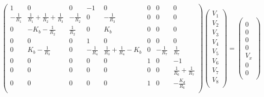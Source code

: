 \begin{equation}
  \begin{pmatrix}
    1 & 0 & 0 & -1 & 0 & 0 & 0 & 0 \\
    -\frac{1}{R_1} & \frac{1}{R_1}+\frac{1}{R_2}+\frac{1}{R_3} & -\frac{1}{R_2} & 0 & -\frac{1}{R_3} & 0 & 0 & 0 \\
    0 & -K_b-\frac{1}{R_2} & \frac{1}{R_2} & 0 & K_b & 0 & 0 & 0 \\
    0 & 0 & 0 & 1 & 0 & 0 & 0 & 0 \\
    0 & K_b-\frac{1}{R_3} & 0 & -\frac{1}{R_4} & \frac{1}{R_3}+\frac{1}{R_4}-K_b & 0 & -\frac{1}{R_7} & \frac{1}{R_7} \\
    0 & 0 & 0 & 0 & 0 & 1 & 0 & -1 \\
    0 & 0 & 0 & 0 & 0 & 0 & 0 & \frac{1}{R_6}+\frac{1}{R_7} \\
    0 & 0 & 0 & 0 & 0 & 1 & 0 & -\frac{K_d}{R_6} \\
  \end{pmatrix}
  \begin{pmatrix}
    V_1  \\
    V_2  \\
    V_3  \\
    V_4  \\
    V_5  \\
    V_6  \\
    V_7  \\
    V_8  \\
  \end{pmatrix}
  =
  \begin{pmatrix}
     \\
    0   \\
    0   \\
    0   \\
    0   \\
    V_x  \\
    0   \\
    0   \\
  \end{pmatrix}
  \label{eq:Exercise1LinearSystem}
\end{equation}

